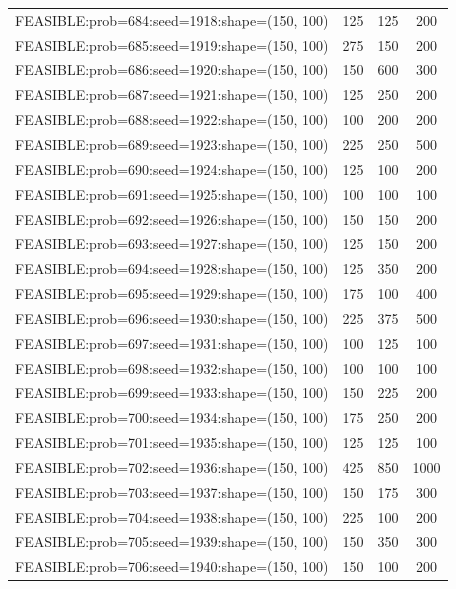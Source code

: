 \begin{longtable}{lccc}
FEASIBLE:prob=684:seed=1918:shape=(150, 100) &      125 &   125 &    200 \\
FEASIBLE:prob=685:seed=1919:shape=(150, 100) &      275 &   150 &    200 \\
FEASIBLE:prob=686:seed=1920:shape=(150, 100) &      150 &   600 &    300 \\
FEASIBLE:prob=687:seed=1921:shape=(150, 100) &      125 &   250 &    200 \\
FEASIBLE:prob=688:seed=1922:shape=(150, 100) &      100 &   200 &    200 \\
FEASIBLE:prob=689:seed=1923:shape=(150, 100) &      225 &   250 &    500 \\
FEASIBLE:prob=690:seed=1924:shape=(150, 100) &      125 &   100 &    200 \\
FEASIBLE:prob=691:seed=1925:shape=(150, 100) &      100 &   100 &    100 \\
FEASIBLE:prob=692:seed=1926:shape=(150, 100) &      150 &   150 &    200 \\
FEASIBLE:prob=693:seed=1927:shape=(150, 100) &      125 &   150 &    200 \\
FEASIBLE:prob=694:seed=1928:shape=(150, 100) &      125 &   350 &    200 \\
FEASIBLE:prob=695:seed=1929:shape=(150, 100) &      175 &   100 &    400 \\
FEASIBLE:prob=696:seed=1930:shape=(150, 100) &      225 &   375 &    500 \\
FEASIBLE:prob=697:seed=1931:shape=(150, 100) &      100 &   125 &    100 \\
FEASIBLE:prob=698:seed=1932:shape=(150, 100) &      100 &   100 &    100 \\
FEASIBLE:prob=699:seed=1933:shape=(150, 100) &      150 &   225 &    200 \\
FEASIBLE:prob=700:seed=1934:shape=(150, 100) &      175 &   250 &    200 \\
FEASIBLE:prob=701:seed=1935:shape=(150, 100) &      125 &   125 &    100 \\
FEASIBLE:prob=702:seed=1936:shape=(150, 100) &      425 &   850 &   1000 \\
FEASIBLE:prob=703:seed=1937:shape=(150, 100) &      150 &   175 &    300 \\
FEASIBLE:prob=704:seed=1938:shape=(150, 100) &      225 &   100 &    200 \\
FEASIBLE:prob=705:seed=1939:shape=(150, 100) &      150 &   350 &    300 \\
FEASIBLE:prob=706:seed=1940:shape=(150, 100) &      150 &   100 &    200 \\

\end{longtable}
